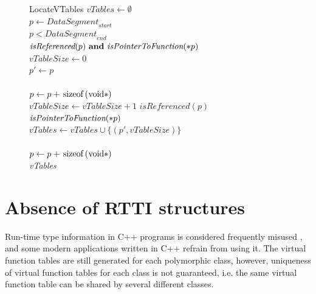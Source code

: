 \documentclass[times, 10pt,twocolumn]{article}
\begin{document}
\begin{figure}[htb!]
\small
\lstset{basicstyle=\small}
\begin{minipage}[b]{0.5\textwidth}
\begin{algorithm}{LocateVTables}{
    \label{alg:find_vtables}
}
$\textit{vTables} \gets \emptyset$ \\
$p \gets \textit{DataSegment}_{\textit{start}}$ \\
\qwhile $p < \textit{DataSegment}_{\textit{end}}$ \qdo \\
    \qif $\textit{isReferenced}(p) ~ \textbf{and} ~ \textit{isPointerToFunction}(\text{\lstinline{*}}p)$ \qthen \\
        $\textit{vTableSize} \gets 0$ \\
        $p' \gets p$ \\
        \qrepeat \\
            $p \gets p + \text{\lstinline{sizeof(void*)}}$ \\
            $\textit{vTableSize} \gets \textit{vTableSize} + 1$
        \quntil $\textit{isReferenced}(p)$ \qor \qnot $\textit{isPointerToFunction}(\text{\lstinline{*}}p)$ \\
        $\textit{vTables} \gets \textit{vTables} \cup \{(p', \textit{vTableSize})\}$ \\
    \qelse \\
        $p \gets p + \text{\lstinline{sizeof(void*)}}$ 
    \qfi
\qelihw \\
\qreturn \textit{vTables}
\end{algorithm}
\end{minipage}
\end{figure}

\section{Absence of RTTI structures}
\label{sectionNoRTTIAnalysis}

Run-time type information in C++ programs
is considered frequently misused \cite{stroustrup93},
and some modern applications written in C++ refrain from using it.
The virtual function tables are still generated for each polymorphic class,
however, uniqueness of virtual function tables for each class
is not guaranteed, i.e. the same virtual function table
can be shared by several different classes.
\end{document}
